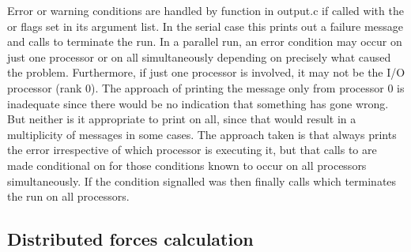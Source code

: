 \documentclass[a4paper,twoside]{report}
\newcommand{\Fname}[1]{{\upshape\mdseries\sffamily#1}}
\begin{document}
Error or warning conditions are handled by function 
in \Fname{output.c} if called with the  or 
flags set in its argument list.  In the serial case this prints out a
failure message and calls  to terminate the run.  In a
parallel run, an error condition may occur on just one processor or on
all simultaneously depending on precisely what caused the problem.
Furthermore, if just one processor is involved, it may not be the I/O
processor (rank 0).  The approach of printing the message only from
processor 0 is inadequate since there would be no indication that
something has gone wrong.  But neither is it appropriate to print on
all, since that would result in a multiplicity of messages in some
cases.  The approach taken is that  always prints
the error irrespective of which processor is executing it, but that
calls to  are made conditional on
 for those conditions known to occur on all
processors simultaneously. If the condition signalled was
 then  finally calls 
which terminates the run on all processors.

\subsection{Distributed forces calculation}
\end{document}
